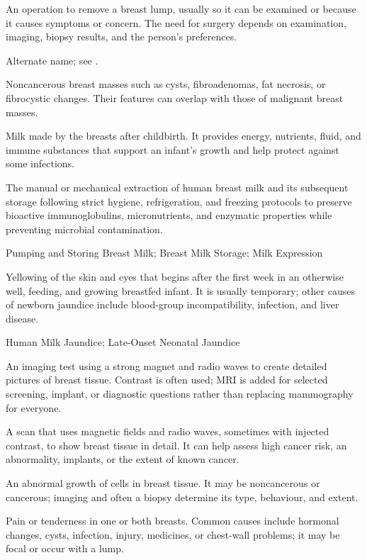  An operation to remove a breast lump, usually so it can be examined or because it causes symptoms or concern. The need for surgery depends on examination, imaging, biopsy results, and the person's preferences.

 Alternate name; see .

 Noncancerous breast masses such as cysts, fibroadenomas, fat necrosis, or fibrocystic changes. Their features can overlap with those of malignant breast masses.

 Milk made by the breasts after childbirth. It provides energy, nutrients, fluid, and immune substances that support an infant's growth and help protect against some infections.

 The manual or mechanical extraction of human breast milk and its subsequent storage following strict hygiene, refrigeration, and freezing protocols to preserve bioactive immunoglobulins, micronutrients, and enzymatic properties while preventing microbial contamination.

\synonyms
Pumping and Storing Breast Milk; Breast Milk Storage; Milk Expression

 Yellowing of the skin and eyes that begins after the first week in an otherwise well, feeding, and growing breastfed infant. It is usually temporary; other causes of newborn jaundice include blood-group incompatibility, infection, and liver disease.

\synonyms
Human Milk Jaundice; Late-Onset Neonatal Jaundice

 An imaging test using a strong magnet and radio waves to create detailed pictures of breast tissue. Contrast is often used; MRI is added for selected screening, implant, or diagnostic questions rather than replacing mammography for everyone.

 A scan that uses magnetic fields and radio waves, sometimes with injected contrast, to show breast tissue in detail. It can help assess high cancer risk, an abnormality, implants, or the extent of known cancer.

 An abnormal growth of cells in breast tissue. It
may be noncancerous or cancerous; imaging and often a biopsy determine its
type, behaviour, and extent.

 Pain or tenderness in one or both breasts. Common causes include hormonal changes, cysts, infection, injury, medicines, or chest-wall problems; it may be focal or occur with a lump.

